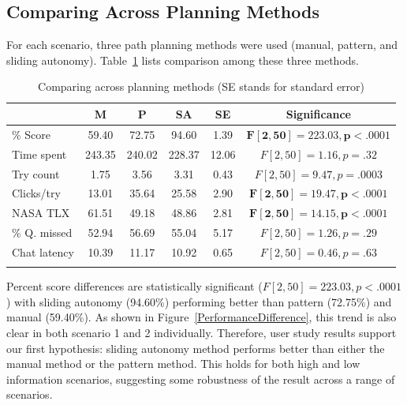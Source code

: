 \documentclass[lettersize, apacite, twoside, HRI]{apa_HRI}
\begin{document}
\subsection{Comparing Across Planning Methods}

For each scenario, three path planning methods were used (manual, pattern, and sliding autonomy). Table~\ref{AcrossMethods} lists comparison among these three methods. 

\begin{table}
\caption{Comparing across planning methods (SE stands for standard error)}
	\centering
		\begin{tabular}
			{|l|c|c|c|c|c|}
			\hline
			& M & P & SA & SE & Significance \\			
			\hline
			\% Score & 59.40 & 72.75 & 94.60 & 1.39 & $\boldsymbol{F[2,50]=223.03, p<.0001}$ \\
			Time spent & 243.35 & 240.02 & 228.37 & 12.06 & $F[2,50]=1.16, p=.32$ \\
			Try count & 1.75 & 3.56 & 3.31 & 0.43 & $F[2,50]=9.47, p=.0003$ \\
			Clicks/try & 13.01 & 35.64 & 25.58 & 2.90 & $\boldsymbol{F[2,50]=19.47, p<.0001}$ \\
			NASA TLX & 61.51 & 49.18 & 48.86 & 2.81 & $\boldsymbol{F[2,50]=14.15, p<.0001}$ \\
			\hline
			\% Q. missed & 52.94 & 56.69 & 55.04 & 5.17 & $F[2,50]=1.26, p=.29$ \\
			Chat latency & 10.39 & 11.17 & 10.92 & 0.65 & $F[2,50]=0.46, p=.63$ \\
			\hline			
			\multicolumn{6}{c}{}  %
		\end{tabular}
\label{AcrossMethods}
\end{table}

Percent score differences are statistically significant ($F[2,50]= 223.03, p<.0001$) with sliding autonomy (94.60\%) performing better than pattern (72.75\%) and manual (59.40\%). As shown in Figure~\ref{PerformanceDifference}, this trend is also clear in both scenario 1 and 2 individually. Therefore, user study results support our first hypothesis: sliding autonomy method performs better than either the manual method or the pattern method. This holds for both high and low information scenarios, suggesting some robustness of the result across a range of scenarios.
\end{document}
